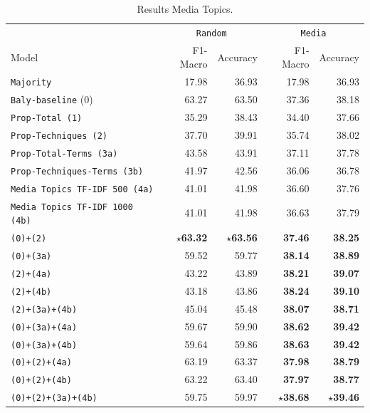\begin{table}[!htbp]
    \centering
   \scriptsize
    \begin{tabular}{l|rr|rr}
        & \multicolumn{2}{c}{\texttt{Random}} & \multicolumn{2}{c}{\texttt{Media}} \\
        Model & F1-Macro & Accuracy & F1-Macro & Accuracy \\
        \hline
        \texttt{Majority} & 17.98 & 36.93 & 17.98 & 36.93 \\
        \texttt{Baly-baseline} (0) & 63.27 & 63.50 & 37.36 & 38.18 \\
        \hline
        \texttt{Prop-Total (1)} & 35.29 & 38.43 & 34.40 & 37.66 \\
        \texttt{Prop-Techniques (2)} & 37.70 & 39.91 & 35.74 & 38.02  \\
        \texttt{Prop-Total-Terms (3a)} & 43.58 & 43.91 & 37.11 & 37.78 \\
        \texttt{Prop-Techniques-Terms (3b)} & 41.97 & 42.56 & 36.06 & 36.78 \\
        \hline
        \texttt{Media Topics TF-IDF 500 (4a)} & 41.01 & 41.98 & 36.60 & 37.76 \\
        \texttt{Media Topics TF-IDF 1000 (4b)} & 41.01 & 41.98 & 36.63 & 37.79 \\
        \hline
        \texttt{(0)+(2)} & \textbf{$\star$63.32} & \textbf{$\star$63.56} & \textbf{37.46} & \textbf{38.25}  \\
        \texttt{(0)+(3a)} & 59.52 & 59.77 & \textbf{38.14} & \textbf{38.89}  \\
        \hline
        \texttt{(2)+(4a)} & 43.22 & 43.89 & \textbf{38.21} & \textbf{39.07}  \\
        \texttt{(2)+(4b)} & 43.18 & 43.86 & \textbf{38.24} & \textbf{39.10}  \\
        \texttt{(2)+(3a)+(4b)} & 45.04 & 45.48 & \textbf{38.07} & \textbf{38.71}  \\
        \texttt{(0)+(3a)+(4a)} & 59.67 & 59.90 & \textbf{38.62} & \textbf{39.42}   \\
        \texttt{(0)+(3a)+(4b)} & 59.64 & 59.86 & \textbf{38.63} & \textbf{39.42}  \\
        \texttt{(0)+(2)+(4a)} & 63.19 & 63.37 & \textbf{37.98} & \textbf{38.79}  \\
        \texttt{(0)+(2)+(4b)} & 63.22 & 63.40 & \textbf{37.97} & \textbf{38.77}  \\
        \texttt{(0)+(2)+(3a)+(4b)} & 59.75 & 59.97 & \textbf{$\star$38.68} & \textbf{$\star$39.46}  \\
        
        
    \end{tabular}
    \caption{Results Media Topics.}
    \label{tab:results_classifier_with_mediatopics}
\end{table}

